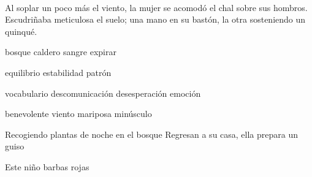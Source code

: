 \mytitle{\Large }\\[0.1cm]

Al soplar un poco más el viento, la mujer se acomodó el chal sobre sus hombros. Escudriñaba meticulosa el suelo; una mano en su bastón, la otra sosteniendo un quinqué.





bosque caldero sangre expirar

equilibrio estabilidad patrón

vocabulario descomunicación desesperación emoción

benevolente viento mariposa minúsculo


Recogiendo plantas de noche en el bosque
Regresan a su casa, ella prepara un guiso



Este niño barbas rojas





\\[0.5cm]